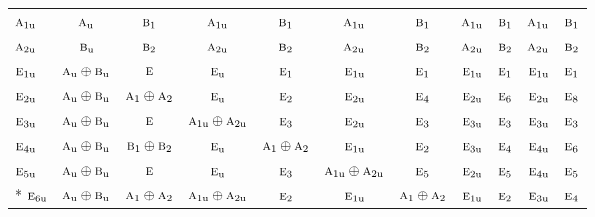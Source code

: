 \documentclass[10pt,a4paper]{article}
\numberwithin{equation}{section}
\newcommand{\irr}[1]{\text{\normalfont\scshape #1}}
\newcommand{\ptag}[1]{\mathrm{#1}}
\begin{document}
{\begin{longtable}{@{}lcccccccccc@{}}
$\irr{a}_{1\ptag{u}}$ & $\irr{a}_{\ptag{u}}$ & $\irr{b}_{1}$ & $\irr{a}_{1\ptag{u}}$ & $\irr{b}_{1}$ & $\irr{a}_{1\ptag{u}}$ & $\irr{b}_{1}$ & $\irr{a}_{1\ptag{u}}$ & $\irr{b}_{1}$ & $\irr{a}_{1\ptag{u}}$ & $\irr{b}_{1}$\\
$\irr{a}_{2\ptag{u}}$ & $\irr{b}_{\ptag{u}}$ & $\irr{b}_{2}$ & $\irr{a}_{2\ptag{u}}$ & $\irr{b}_{2}$ & $\irr{a}_{2\ptag{u}}$ & $\irr{b}_{2}$ & $\irr{a}_{2\ptag{u}}$ & $\irr{b}_{2}$ & $\irr{a}_{2\ptag{u}}$ & $\irr{b}_{2}$\\
$\irr{e}_{1\ptag{u}}$ & $\irr{a}_{\ptag{u}}\oplus \irr{b}_{\ptag{u}}$ & $\irr{e}$ & $\irr{e}_{\ptag{u}}$ & $\irr{e}_{1}$ & $\irr{e}_{1\ptag{u}}$ & $\irr{e}_{1}$ & $\irr{e}_{1\ptag{u}}$ & $\irr{e}_{1}$ & $\irr{e}_{1\ptag{u}}$ & $\irr{e}_{1}$\\
$\irr{e}_{2\ptag{u}}$ & $\irr{a}_{\ptag{u}}\oplus \irr{b}_{\ptag{u}}$ & $\irr{a}_{1}\oplus \irr{a}_{2}$ & $\irr{e}_{\ptag{u}}$ & $\irr{e}_{2}$ & $\irr{e}_{2\ptag{u}}$ & $\irr{e}_{4}$ & $\irr{e}_{2\ptag{u}}$ & $\irr{e}_{6}$ & $\irr{e}_{2\ptag{u}}$ & $\irr{e}_{8}$\\
$\irr{e}_{3\ptag{u}}$ & $\irr{a}_{\ptag{u}}\oplus \irr{b}_{\ptag{u}}$ & $\irr{e}$ & $\irr{a}_{1\ptag{u}}\oplus \irr{a}_{2\ptag{u}}$ & $\irr{e}_{3}$ & $\irr{e}_{2\ptag{u}}$ & $\irr{e}_{3}$ & $\irr{e}_{3\ptag{u}}$ & $\irr{e}_{3}$ & $\irr{e}_{3\ptag{u}}$ & $\irr{e}_{3}$\\
$\irr{e}_{4\ptag{u}}$ & $\irr{a}_{\ptag{u}}\oplus \irr{b}_{\ptag{u}}$ & $\irr{b}_{1}\oplus \irr{b}_{2}$ & $\irr{e}_{\ptag{u}}$ & $\irr{a}_{1}\oplus \irr{a}_{2}$ & $\irr{e}_{1\ptag{u}}$ & $\irr{e}_{2}$ & $\irr{e}_{3\ptag{u}}$ & $\irr{e}_{4}$ & $\irr{e}_{4\ptag{u}}$ & $\irr{e}_{6}$\\
$\irr{e}_{5\ptag{u}}$ & $\irr{a}_{\ptag{u}}\oplus \irr{b}_{\ptag{u}}$ & $\irr{e}$ & $\irr{e}_{\ptag{u}}$ & $\irr{e}_{3}$ & $\irr{a}_{1\ptag{u}}\oplus \irr{a}_{2\ptag{u}}$ & $\irr{e}_{5}$ & $\irr{e}_{2\ptag{u}}$ & $\irr{e}_{5}$ & $\irr{e}_{4\ptag{u}}$ & $\irr{e}_{5}$\\*
$\irr{e}_{6\ptag{u}}$ & $\irr{a}_{\ptag{u}}\oplus \irr{b}_{\ptag{u}}$ & $\irr{a}_{1}\oplus \irr{a}_{2}$ & $\irr{a}_{1\ptag{u}}\oplus \irr{a}_{2\ptag{u}}$ & $\irr{e}_{2}$ & $\irr{e}_{1\ptag{u}}$ & $\irr{a}_{1}\oplus \irr{a}_{2}$ & $\irr{e}_{1\ptag{u}}$ & $\irr{e}_{2}$ & $\irr{e}_{3\ptag{u}}$ & $\irr{e}_{4}$\\
\bottomrule\end{longtable}}
\end{document}
